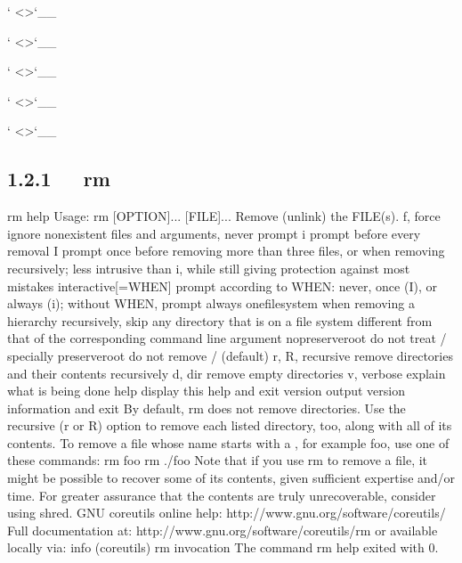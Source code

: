 \documentclass[letterpaper,12pt,english]{sphinxmanual}
\begin{document}
{}` \textless{}\textgreater{}{}`\_\_

{}` \textless{}\textgreater{}{}`\_\_

{}` \textless{}\textgreater{}{}`\_\_

{}` \textless{}\textgreater{}{}`\_\_

{}` \textless{}\textgreater{}{}`\_\_


\subsection{1.2.1   rm}
\label{\detokenize{001software/001install/linux:rm}}
\begin{sphinxVerbatim}[commandchars=\\\{\}]
\PYGZdl{} rm \PYGZhy{}\PYGZhy{}help
Usage: rm [OPTION]... [FILE]...
Remove (unlink) the FILE(s).
  \PYGZhy{}f, \PYGZhy{}\PYGZhy{}force           ignore nonexistent files and arguments, never   prompt
  \PYGZhy{}i                    prompt before every removal
  \PYGZhy{}I                    prompt once before removing more than three   files, or
                          when removing recursively; less intrusive than   \PYGZhy{}i,
                          while still giving protection against most   mistakes
      \PYGZhy{}\PYGZhy{}interactive[=WHEN]  prompt according to WHEN: never, once (\PYGZhy{}I),   or
                          always (\PYGZhy{}i); without WHEN, prompt always
      \PYGZhy{}\PYGZhy{}one\PYGZhy{}file\PYGZhy{}system  when removing a hierarchy recursively, skip any
                          directory that is on a file system different   from
                          that of the corresponding command line argument
      \PYGZhy{}\PYGZhy{}no\PYGZhy{}preserve\PYGZhy{}root  do not treat \PYGZsq{}/\PYGZsq{} specially
      \PYGZhy{}\PYGZhy{}preserve\PYGZhy{}root   do not remove \PYGZsq{}/\PYGZsq{} (default)
  \PYGZhy{}r, \PYGZhy{}R, \PYGZhy{}\PYGZhy{}recursive   remove directories and their contents recursively
  \PYGZhy{}d, \PYGZhy{}\PYGZhy{}dir             remove empty directories
  \PYGZhy{}v, \PYGZhy{}\PYGZhy{}verbose         explain what is being done
      \PYGZhy{}\PYGZhy{}help     display this help and exit
      \PYGZhy{}\PYGZhy{}version  output version information and exit
By default, rm does not remove directories.  Use the \PYGZhy{}\PYGZhy{}recursive (\PYGZhy{}r or   \PYGZhy{}R)
option to remove each listed directory, too, along with all of its   contents.
To remove a file whose name starts with a \PYGZsq{}\PYGZhy{}\PYGZsq{}, for example \PYGZsq{}\PYGZhy{}foo\PYGZsq{},
use one of these commands:
  rm \PYGZhy{}\PYGZhy{} \PYGZhy{}foo
  rm ./\PYGZhy{}foo
Note that if you use rm to remove a file, it might be possible to recover
some of its contents, given sufficient expertise and/or time.  For   greater
assurance that the contents are truly unrecoverable, consider using   shred.
GNU coreutils online help: \PYGZlt{}http://www.gnu.org/software/coreutils/\PYGZgt{}
Full documentation at: \PYGZlt{}http://www.gnu.org/software/coreutils/rm\PYGZgt{}
or available locally via: info \PYGZsq{}(coreutils) rm invocation\PYGZsq{}
The command \PYGZdq{}rm \PYGZhy{}\PYGZhy{}help\PYGZdq{} exited with 0.
\end{sphinxVerbatim}
\end{document}
